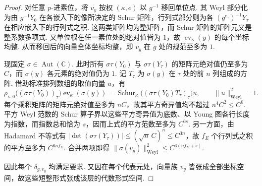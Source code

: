 \begin{proof}
对任意 $p$-进素位，将 $v_y$ 按权 $(\kappa,e)$ 以 $g^{-1}$ 移回单位点. 其 Weyl 部分化为由 $g^{-1}Y_0$ 在各嵌入下的像所决定的 Schur 矩阵，行列式部分则为各 $(g^{e_\tau})^{-1}Y_\tau$ 在相应嵌入下的行列式之积. 这两类矩阵均为整矩阵，而 Schur 矩阵的矩阵元又是整系数多项式. 又单位根在任一素位处的绝对值皆为 $1$，故 $\operatorname{ev}_\kappa(y)$ 的每个坐标均整. 从而移回后的向量全体坐标均整，即 $v_y$ 在 $g$ 处的规范至多为 $1$.

现固定 $\sigma\in\operatorname{Aut}(\mathbb C)$. 此时所有 $\sigma\tau(Y_0)$ 与 $\sigma\tau(Y_\tau)$ 的矩阵元绝对值仍至多为 $C$，而 $\sigma(y)$ 各元素的绝对值仍为 $1$. 记 $T_\tau$ 为 $\sigma(y)$ 在 $\tau$ 处的前 $n$ 列组成的方阵. 借助标准排列数组的取值向量 $u$，有
\[
 \rho_{\kappa,0}\bigl((\sigma\tau(Y_0))_\tau\bigr)
       \operatorname{ev}_\kappa(\sigma(y))
 =\operatorname{Schur}_\kappa\bigl((\sigma\tau(Y_0)T_\tau)_\tau\bigr)u,
 \qquad \|u\|_{\mathrm{Weyl}}^2=1.
\]
每个乘积矩阵的矩阵元绝对值至多为 $nC$，故其平方奇异值均不超过 $n^4C^2\le C^6$. 平方 Weyl 范数的 Schur 算子界以这些平方奇异值为底数、以 Young 图各行长度为指数，而指数总和恰为 $s$，因而上式的平方范数至多为 $C^{6s}$. 另一方面，由 Hadamard 不等式有
$|\det(\sigma\tau(Y_\tau))|\le(\sqrt n\,C)^n\le C^{3n}$，故 $f_E$ 个行列式之积的平方至多为 $C^{6nf_E}$. 合并两项即得 $\|\sigma(v_y)\|^2_{\mathrm{Weyl}}\le C^{6(nf_E+s)}$.

因此每个 $\delta_{g,v_y}$ 均满足要求. 又因在每个代表元处，向量族 $v_y$ 皆张成全部坐标空间，故这些短整形式张成该层的代数形式空间.
\end{proof}

